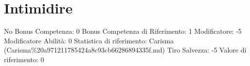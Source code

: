 \section{Intimidire}\label{intimidire}

\begin{description}
\tightlist
\item[Tags: ABI]
No Bonus Competenza: 0 Bonus Competenza di Riferimento: 1 Modificatore:
-5 Modificatore Abilità: 0 Statistica di riferimento: Carisma
(Carisma\%20a971211785424a8c93cb66286894335f.md) Tiro Salvezza: -5
Valore di riferimento: 0
\end{description}
